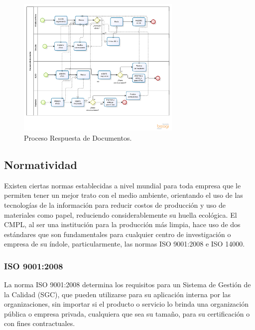 	\begin{figure}
		\centering
			\includegraphics[width=0.7\textwidth]{images/procesorespuesta}
		\caption{Proceso Respuesta de Documentos.}
	\end{figure}

\subsection{Normatividad}	

Existen ciertas normas establecidas a nivel mundial para toda empresa que le permiten tener un mejor trato con el medio ambiente, orientando el uso de las tecnologías de la información para reducir costos de producción y uso de materiales como papel, reduciendo considerablemente su huella ecológica. El CMPL, al ser una institución para la producción más limpia, hace uso de dos estándares que son fundamentales para cualquier centro de investigación o empresa de su índole, particularmente, las normas ISO 9001:2008 e ISO 14000.\\

\subsubsection{ISO 9001:2008}

La norma ISO 9001:2008 determina los requisitos para un Sistema de Gestión de la Calidad (SGC), que pueden utilizarse para su aplicación interna por las organizaciones, sin importar si el producto o servicio lo brinda una organización pública o empresa privada, cualquiera que sea su tamaño, para su certificación o con fines contractuales.\\

